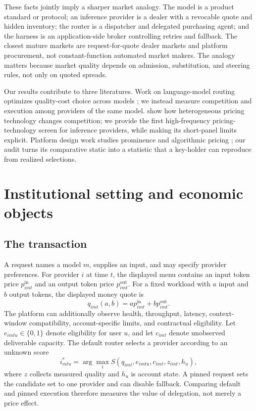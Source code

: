 \documentclass[11pt]{article}
\newcommand{\1}{\mathbf{1}}
\begin{document}
These facts jointly imply a sharper market analogy.  The model is a product
standard or protocol; an inference provider is a dealer with a revocable quote
and hidden inventory; the router is a dispatcher and delegated purchasing agent;
and the harness is an application-side broker controlling retries and fallback.
The closest mature markets are request-for-quote dealer markets and platform
procurement, not constant-function automated market makers.  The analogy matters
because market quality depends on admission, substitution, and steering rules,
not only on quoted spreads.

Our results contribute to three literatures.  Work on language-model routing
optimizes quality-cost choice across models \cite{chen2023frugalgpt,
ong2024routellm,hu2024routerbench}; we instead measure competition and execution
among providers of the same model.  \citet{brownmackay2023} show how
heterogeneous pricing technology changes
competition; we provide the first high-frequency pricing-technology screen for
inference providers, while making its short-panel limits explicit.  Platform
design work studies prominence and algorithmic pricing
\citep{johnsonrhodeswildenbeest2023}; our audit turns its comparative static into a
statistic that a key-holder can reproduce from realized selections.

\section{Institutional setting and economic objects}
\label{sec:setting}

\subsection{The transaction}

A request names a model $m$, supplies an input, and may specify provider
preferences.  For provider $i$ at time $t$, the displayed menu contains an input
token price $p^{\mathrm{in}}_{imt}$ and an output token price
$p^{\mathrm{out}}_{imt}$.  For a fixed workload with $a$ input and $b$ output
tokens, the displayed money quote is
\begin{equation}
  q_{imt}(a,b)=a p^{\mathrm{in}}_{imt}+b p^{\mathrm{out}}_{imt}.
  \label{eq:quote}
\end{equation}
The platform can additionally observe health, throughput, latency, context-window
compatibility, account-specific limits, and contractual eligibility.  Let
$e_{imtu}\in\{0,1\}$ denote eligibility for user $u$, and let $c_{imt}$ denote
unobserved deliverable capacity.  The default router selects a provider according
to an unknown score
\begin{equation}
  i^*_{mtu}=\arg\max_i S(q_{imt},e_{imtu},c_{imt},z_{imt},h_u),
  \label{eq:score}
\end{equation}
where $z$ collects measured quality and $h_u$ is account state.  A pinned request
sets the candidate set to one provider and can disable fallback.  Comparing
default and pinned execution therefore measures the value of delegation, not
merely a price effect.
\end{document}
